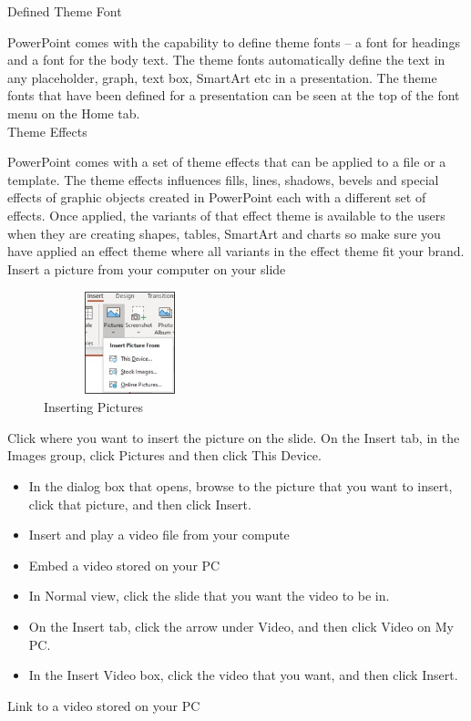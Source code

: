 \documentclass[11pt,a4paper,twoside]{article}
\begin{document}
Defined Theme Font\par
PowerPoint comes with the capability to define theme fonts – a font for headings and a font for the body text. The theme fonts automatically define the text in any placeholder, graph, text box, SmartArt etc in a presentation. The theme fonts that have been defined for a presentation can be seen at the top of the font menu on the Home tab.\\
Theme Effects\par
PowerPoint comes with a set of theme effects that can be applied to a file or a template. The theme effects influences fills, lines, shadows, bevels and special effects of graphic objects created in PowerPoint each with a different set of effects. Once applied, the variants of that effect theme is available to the users when they are creating shapes, tables, SmartArt and charts so make sure you have applied an effect theme where all variants in the effect theme fit your brand.\\
Insert a picture from your computer on your slide
\begin{figure}
\includegraphics[width=5cm,height=3cm]{Fig 31.jpg}
\caption{Inserting Pictures}
\end{figure}
Click where you want to insert the picture on the slide.
On the Insert tab, in the Images group, click Pictures and then click This Device.
\begin{itemize}
\item In the dialog box that opens, browse to the picture that you want to insert, click that picture, and then click Insert.
\item Insert and play a video file from your compute
\item Embed a video stored on your PC
\item In Normal view, click the slide that you want the video to be in.
\item On the Insert tab, click the arrow under Video, and then click Video on My PC.
\item In the Insert Video box, click the video that you want, and then click Insert.
\end{itemize}
Link to a video stored on your PC\par
\end{document}
